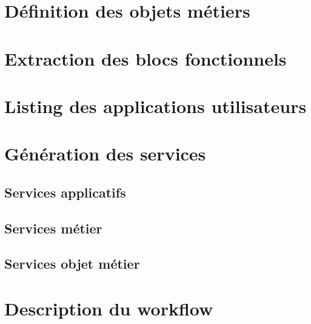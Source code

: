




\section{Définition des objets métiers}

\section{Extraction des blocs fonctionnels}

\section{Listing des applications utilisateurs}

\section{Génération des services}
\subsection{Services applicatifs}

\subsection{Services métier}

\subsection{Services objet métier}

\section{Description du workflow}



